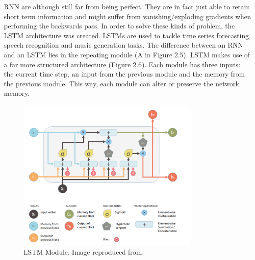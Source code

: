 RNN are although still far from being perfect. They are in fact just able to retain short term information and might suffer from vanishing/exploding gradients when performing the backwards pass. In order to solve these kinds of problem, the LSTM architecture was created. LSTMs are used to tackle time series forecasting, speech recognition and music generation tasks. The difference between an RNN and an LSTM lies in the repeating module (A in Figure 2.5). LSTM makes use of a far more structured architecture (Figure 2.6). Each module has three inputs: the current time step, an input from the previous module and the memory from the previous module. This way, each module can alter or preserve the network memory. 

\begin{figure}[ht!]%
    \centering
    \includegraphics[width=9cm]{images/lstmcell.PNG}%
    \caption{LSTM Module. Image reproduced from: \cite{lstm}}%
\end{figure}

